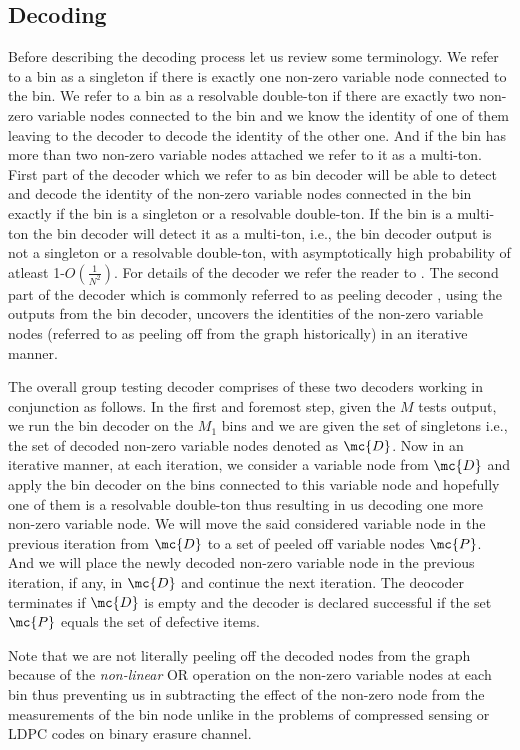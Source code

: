 \documentclass[conference,twocolumn]{IEEEtran}
\begin{document}
\subsection*{Decoding}
Before describing the decoding process let us review some terminology. We refer to a bin as a singleton if there is exactly one non-zero variable node connected to the bin. We refer to a bin as a resolvable double-ton if there are exactly two non-zero variable nodes connected to the bin and we know the identity of one of them leaving to the decoder to decode the identity of the other one. And if the bin has more than two non-zero variable nodes attached we refer to it as a multi-ton. First part of the decoder which we refer to as bin decoder will be able to detect and decode the identity of the non-zero variable nodes connected in the bin exactly if the bin is a singleton or a resolvable double-ton. If the bin is a multi-ton the bin decoder will detect it as a multi-ton, i.e., the bin decoder output is not a singleton or a resolvable double-ton, with asymptotically high probability of atleast 1-$O(\frac{1}{N^2})$. For details of the decoder we refer the reader to \cite{lee2015saffron}. The second part of the decoder which is commonly referred to as peeling decoder \cite{li2015subisit}, using the outputs from the bin decoder, uncovers the identities of the non-zero variable nodes (referred to as peeling off from the graph historically) in an iterative manner. 

The overall group testing decoder comprises of these two decoders working in conjunction as follows. In the first and foremost step, given the $M$ tests output, we run the bin decoder on the $M_1$ bins and we are given the set of singletons i.e., the set of decoded non-zero variable nodes denoted as $\mc{D}$. Now in an iterative manner, at each iteration, we consider a variable node from $\mc{D}$ and apply the bin decoder on the bins connected to this variable node and hopefully one of them is a resolvable double-ton thus resulting in us decoding one more non-zero variable node. We will move the said considered variable node in the previous iteration from $\mc{D}$ to a set of peeled off variable nodes $\mc{P}$. And we will place the newly decoded non-zero variable node in the previous iteration, if any, in $\mc{D}$ and continue the next iteration. The deocoder terminates if $\mc{D}$ is empty and the decoder is declared successful if the set $\mc{P}$ equals the set of defective items. 
\begin{Remark}
 Note that we are not literally peeling off the decoded nodes from the graph because of the \textit{non-linear} OR operation on the non-zero variable nodes at each bin thus preventing us in subtracting the effect of the non-zero node from the measurements of the bin node unlike in the problems of compressed sensing or LDPC codes on binary erasure channel.
\end{Remark}
\end{document}
